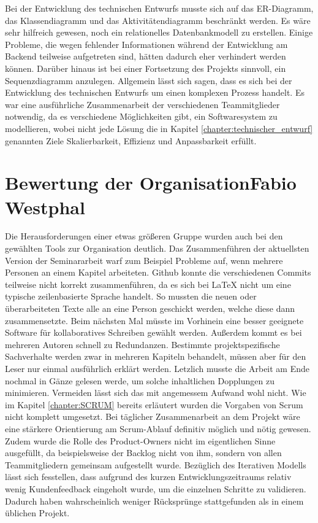 		Bei der Entwicklung des technischen Entwurfs musste sich auf das ER-Diagramm, das Klassendiagramm und das Aktivitätendiagramm beschränkt werden. Es wäre sehr hilfreich gewesen, noch ein relationelles Datenbankmodell zu erstellen. Einige Probleme, die wegen fehlender Informationen während der Entwicklung am Backend teilweise aufgetreten sind, hätten dadurch eher verhindert werden können. Darüber hinaus ist bei einer Fortsetzung des Projekts sinnvoll, ein Sequenzdiagramm anzulegen. Allgemein lässt sich sagen, dass es sich bei der Entwicklung des technischen Entwurfs um einen komplexen Prozess handelt. Es war eine ausführliche Zusammenarbeit der verschiedenen Teammitglieder notwendig, da es verschiedene Möglichkeiten gibt, ein Softwaresystem zu modellieren, wobei nicht jede Lösung die in Kapitel \ref{chapter:technischer_entwurf} genannten Ziele Skalierbarkeit, Effizienz und Anpassbarkeit erfüllt.
		
	\section[Bewertung der Organisation]{Bewertung der Organisation{\hfill \normalsize Fabio Westphal}}
		Die Herausforderungen einer etwas größeren Gruppe wurden auch bei den gewählten Tools zur Organisation deutlich. Das Zusammenführen der aktuellsten Version der Seminararbeit warf zum Beispiel Probleme auf, wenn mehrere Personen an einem Kapitel arbeiteten. Github konnte die verschiedenen Commits teilweise nicht korrekt zusammenführen, da es sich bei LaTeX nicht um eine typische zeilenbasierte Sprache handelt. So mussten die neuen oder überarbeiteten Texte alle an eine Person geschickt werden, welche diese dann zusammensetzte. Beim nächsten Mal müsste im Vorhinein eine besser geeignete Software für kollaboratives Schreiben gewählt werden. Außerdem kommt es bei mehreren Autoren schnell zu Redundanzen. Bestimmte projektspezifische Sachverhalte werden zwar in mehreren Kapiteln behandelt, müssen aber für den Leser nur einmal ausführlich erklärt werden. Letzlich musste die Arbeit am Ende nochmal in Gänze gelesen werde, um solche inhaltlichen Dopplungen zu minimieren. Vermeiden lässt sich das mit angemessem Aufwand wohl nicht.
		Wie im Kapitel \ref{chapter:SCRUM} bereits erläutert wurden die Vorgaben von Scrum nicht komplett umgesetzt. Bei täglicher Zusammenarbeit an dem Projekt wäre eine stärkere Orientierung am Scrum-Ablauf definitiv möglich und nötig gewesen. Zudem wurde die Rolle des Product-Owners nicht im eigentlichen Sinne ausgefüllt, da beispielsweise der Backlog nicht von ihm, sondern von allen Teammitgliedern gemeinsam aufgestellt wurde. Bezüglich des Iterativen Modells lässt sich fesstellen, dass aufgrund des kurzen Entwicklungszeitraums relativ wenig Kundenfeedback eingeholt wurde, um die einzelnen Schritte zu validieren. Dadurch haben wahrscheinlich weniger Rücksprünge stattgefunden als in einem üblichen Projekt. 
		
